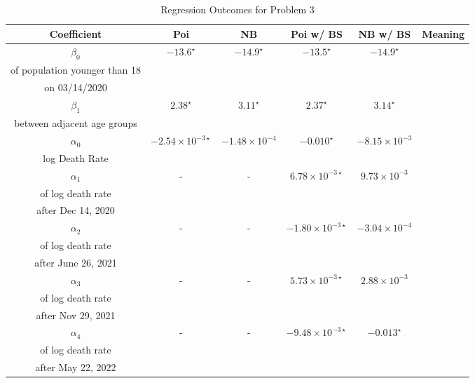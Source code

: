 \documentclass[12pt]{article}
\begin{document}
\begin{enumerate}[(a)]
	\begin{table}[htbp]
		\centering
		\begin{tabular}{cccccc}
			\toprule
			Coefficient & Poi & NB & Poi w/ BS & NB w/ BS & Meaning\\
			\midrule
			$\beta_{0}$ & $-13.6^\star$ & $-14.9^\star$ & $-13.5^\star$ & $-14.9^\star$ & \makecell{Expected log death rate \\of population younger than 18\\ on 03/14/2020 } \\ 
			\addlinespace[0.2cm]
			$\beta_{1}$ & $2.38^\star$ & $3.11^\star$ & $2.37^\star$ & $3.14^\star$ & \makecell{Difference of log death rate \\between adjacent age groups }\\
			\addlinespace[0.2cm]
			$\alpha_{0}$ & $-2.54\times 10^{-3\star}$ & $-1.48\times 10^{-4}$ & $-0.010^\star$ & $-8.15\times 10^{-3}$ & \makecell{Average decrease per week of \\ log Death Rate }\\
			\addlinespace[0.2cm]
			$\alpha_{1}$ & - & - & $6.78\times 10^{-3\star}$  & $9.73\times 10^{-3}$ & \makecell{Change in decrease rate \\ of log death rate\\ after Dec 14, 2020}\\
			\addlinespace[0.2cm]
			$\alpha_{2}$ & - & - & $-1.80\times 10^{-3\star}$ & $-3.04\times 10^{-4}$ & \makecell{Change in decrease rate \\ of log death rate\\ after June 26, 2021}\\
			\addlinespace[0.2cm]
			$\alpha_{3}$ & - & - & $5.73\times 10^{-3\star}$ & $2.88\times 10^{-3}$ & \makecell{Change in decrease rate \\ of log death rate\\ after Nov 29, 2021}\\
			\addlinespace[0.2cm]
			$\alpha_{4}$ & - & - & $-9.48\times 10^{-3\star}$ & $-0.013^\star$ & \makecell{Change in decrease rate \\ of log death rate\\ after May 22, 2022}\\
			\bottomrule
		\end{tabular}
		\caption{Regression Outcomes for Problem 3}\label{p3table}
	\end{table}	
	
	
	
	
\end{enumerate}
\end{document}
